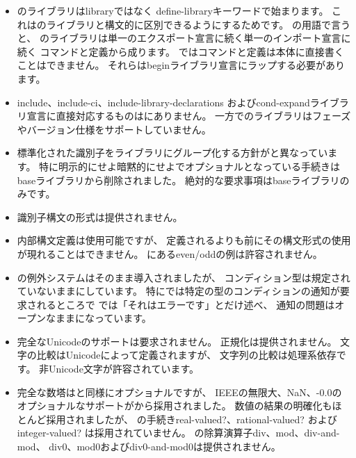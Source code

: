 \begin{itemize}
\item \rsevenrs{}のライブラリは{\cf library}ではなく
{\cf define-\+library}キーワードで始まります。
これは\rsixrs{}のライブラリと構文的に区別できるようにするためです。
\rsevenrs{}の用語で言うと、
\rsixrs{}のライブラリは単一のエクスポート宣言に続く単一のインポート宣言に続く
コマンドと定義から成ります。
\rsevenrs{}ではコマンドと定義は本体に直接書くことはできません。
それらは{\cf begin}ライブラリ宣言にラップする必要があります。

\item {\cf include}、{\cf include-\+ci}、{\cf include-\+library-\+declarations}
および{\cf cond-\+expand}ライブラリ宣言に直接対応するものは\rsixrs{}にありません。
一方で\rsevenrs{}のライブラリはフェーズやバージョン仕様をサポートしていません。

\item 標準化された識別子をライブラリにグループ化する方針が\rsixrs{}と異なっています。
特に明示的にせよ暗黙的にせよ\rfivers{}でオプショナルとなっている手続きは
baseライブラリから削除されました。
絶対的な要求事項はbaseライブラリのみです。

\item 識別子構文の形式は提供されません。

\item 内部構文定義は使用可能ですが、
定義されるよりも前にその構文形式の使用が現れることはできません。
\rsixrs{}にある{\cf even}/{\cf odd}の例は許容されません。

\item \rsixrs{}の例外システムはそのまま導入されましたが、
コンディション型は規定されていないままにしています。
特に\rsixrs{}では特定の型のコンディションの通知が要求されるところで
\rsevenrs{}では「それはエラーです」とだけ述べ、
通知の問題はオープンなままになっています。

\item 完全なUnicodeのサポートは要求されません。
正規化は提供されません。
文字の比較はUnicodeによって定義されますが、
文字列の比較は処理系依存です。
非Unicode文字が許容されています。

\item 完全な数塔は\rfivers{}と同様にオプショナルですが、
IEEEの無限大、NaN、{\mbox -0.0}のオプショナルなサポートが\rsixrs{}から採用されました。
数値の結果の明確化もほとんど採用されましたが、
\rsixrs{}の手続き{\cf real-valued?}、{\cf rational-valued?}
および{\cf integer-valued?} は採用されていません。
\rsixrs{}の除算演算子{\cf div}、{\cf mod}、{\cf div-\+and-\+mod}、
{\cf div0}、{\cf mod0}および{\cf div0-\+and-\+mod0}は提供されません。


\end{itemize}
